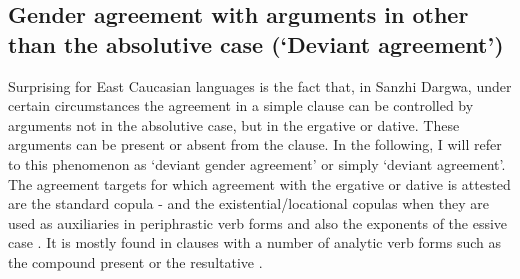 
\subsection{Gender agreement with arguments in other than the absolutive case (`Deviant agreement')}
\label{ssec:Gender agreement with arguments in other than the absolutive case}

Surprising for East Caucasian languages is the fact that, in Sanzhi Dargwa, under certain circumstances the agreement in a simple clause can be controlled by arguments not in the absolutive case, but in the ergative or dative. These arguments can be present or absent from the clause. In the following, I will refer to this phenomenon as ‘deviant gender agreement' or simply ‘deviant agreement'. The agreement targets for which agreement with the ergative or dative is attested are the standard copula - and the existential/locational copulas  when they are used as auxiliaries in periphrastic verb forms and also the exponents of the essive case . It is mostly found in clauses with a number of analytic verb forms such as the compound present  or the resultative . 

